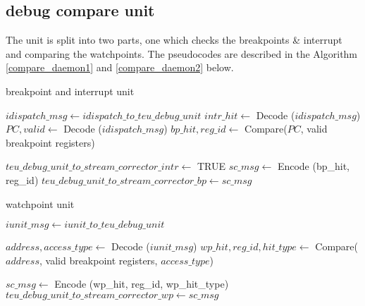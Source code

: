 \documentclass[a4paper, 11pt]{article}
\begin{document}
\newpage
\subsection{debug compare unit}
The unit is split into two parts, one which checks the breakpoints \& interrupt and comparing the watchpoints.
The pseudocodes are described in the Algorithm \ref{compare_daemon1} and \ref{compare_daemon2} below.
\begin{algorithm}
	\caption{breakpoint and interrupt unit}\label{compare_daemon1}
	\begin{algorithmic}[1]
		\State $idispatch\_msg\gets idispatch\_to\_teu\_debug\_unit$
		\State $intr\_hit \gets  $ Decode ($idispatch\_msg$)
			\State $PC, valid \gets $ Decode ($idispatch\_msg$)
			\State $bp\_hit, reg\_id \gets $ Compare($PC$, valid breakpoint registers)
		\EndIf
		
			\State $teu\_debug\_unit\_to\_stream\_corrector\_intr \gets$ TRUE
			\State $sc\_msg \gets $ Encode (bp\_hit, reg\_id)
			\State $teu\_debug\_unit\_to\_stream\_corrector\_bp \gets sc\_msg$
		\EndIf
		
		\EndWhile	
		\EndFunction
	\end{algorithmic}
\end{algorithm}

\begin{algorithm}
	\caption{watchpoint unit}\label{compare_daemon2}
	\begin{algorithmic}[1]
		\State $iunit\_msg\gets iunit\_to\_teu\_debug\_unit$
		
		\State $address, access\_type \gets  $ Decode ($iunit\_msg$)
		\State $wp\_hit, reg\_id, hit\_type \gets $ Compare($address$, valid breakpoint registers, $access\_type$)
		
		\State $sc\_msg \gets $ Encode (wp\_hit, reg\_id, wp\_hit\_type)
		\State $teu\_debug\_unit\_to\_stream\_corrector\_wp \gets sc\_msg$
		\EndIf
		
		\EndWhile	
		\EndFunction
	\end{algorithmic}
\end{algorithm}
\end{document}
